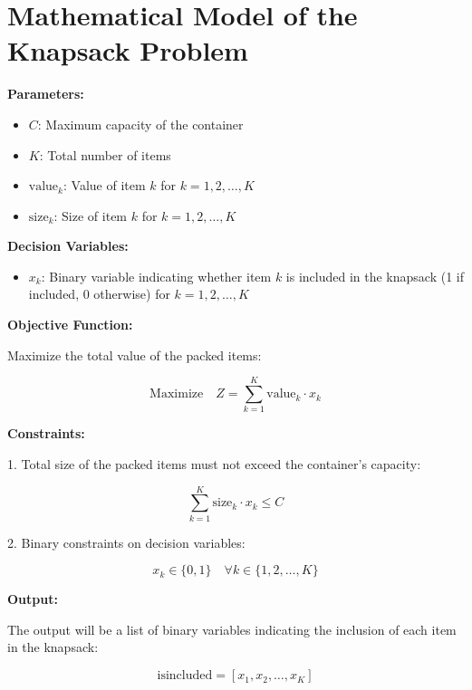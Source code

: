 \documentclass{article}
\begin{document}
\section*{Mathematical Model of the Knapsack Problem}

\textbf{Parameters:}
\begin{itemize}
    \item \( C \): Maximum capacity of the container
    \item \( K \): Total number of items
    \item \( \text{value}_k \): Value of item \( k \) for \( k = 1, 2, \ldots, K \)
    \item \( \text{size}_k \): Size of item \( k \) for \( k = 1, 2, \ldots, K \)
\end{itemize}

\textbf{Decision Variables:}
\begin{itemize}
    \item \( x_k \): Binary variable indicating whether item \( k \) is included in the knapsack (1 if included, 0 otherwise) for \( k = 1, 2, \ldots, K \)
\end{itemize}

\textbf{Objective Function:}

Maximize the total value of the packed items:

\[
\text{Maximize} \quad Z = \sum_{k=1}^{K} \text{value}_k \cdot x_k
\]

\textbf{Constraints:}

1. Total size of the packed items must not exceed the container's capacity:

\[
\sum_{k=1}^{K} \text{size}_k \cdot x_k \leq C
\]

2. Binary constraints on decision variables:

\[
x_k \in \{0, 1\} \quad \forall k \in \{1, 2, \ldots, K\}
\]

\textbf{Output:}

The output will be a list of binary variables indicating the inclusion of each item in the knapsack:

\[
\text{isincluded} = [x_1, x_2, \ldots, x_K]
\]
\end{document}
